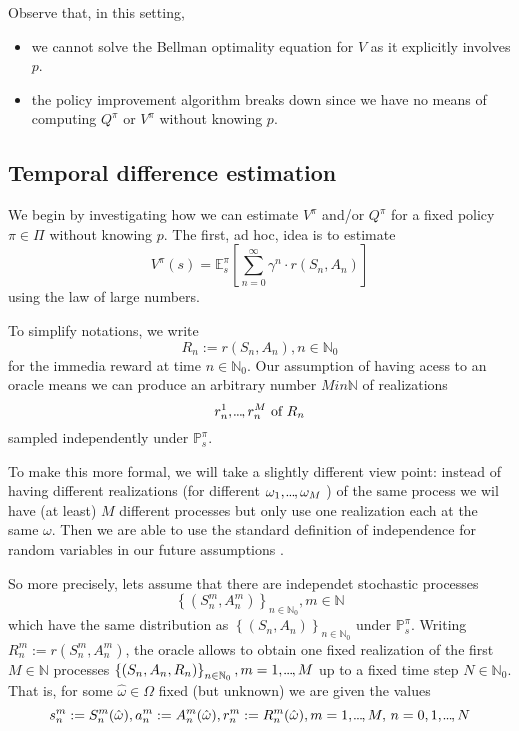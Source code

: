 Observe that, in this setting,
\begin{itemize}
    \item we cannot solve the Bellman optimality equation for \( V \) as it explicitly involves \( p \).
    \item the policy improvement algorithm breaks down since we have no means of computing \( Q^{\pi} \) or \( V^{\pi} \) without knowing \( p \).     
\end{itemize}

\subsection{Temporal difference estimation}

We begin by investigating how we can estimate \( V^{\pi} \) and/or \( Q^\pi \) for a fixed policy \( \pi \in \Pi \) without knowing \( p \). The first, ad hoc, idea is to estimate 
\[
    V^{\pi}(s) = \mathbb{E}_s^\pi \left[ \sum_{n=0}^{\infty} \gamma^n \cdot r(S_n, A_n) \right]
\] 
using the law of large numbers.


To simplify notations, we write 
\[
    R_n := r(S_n, A_n), n \in \mathbb{N}_{0}
\] 
for the immedia reward at time \( n \in \mathbb{N}_{0} \).
Our assumption of having acess to an oracle means we can produce an arbitrary number \( M in \mathbb{N} \) of realizations 
\[
    r_n^1, \kern-0.10em.\kern-0.06em.\kern-0.06em.\kern-0.1em, r_n^M \text{ of } R_n
\]
sampled independently under \( \mathbb{P}_s^\pi \).

To make this more formal, we will take a slightly different view point: instead of having different realizations (for different \( \omega_1, \kern-0.10em.\kern-0.06em.\kern-0.06em.\kern-0.1em, \omega_M \) ) of the same process we wil have (at least) \( M \) different processes but only use one realization each at the same \( \omega \). Then we are able to use the standard definition of independence for random variables in our future assumptions .

So more precisely, lets assume that there are independet stochastic processes 
\[
    \left\{ \left( S_n^m, A_n^m \right) \right\}_{n \in \mathbb{N}_{0}}, m \in \mathbb{N}
\]
which have the same distribution 
as \( \left\{ \left( S_n, A_n \right) \right\}_{n \in \mathbb{N}_{0}} \) under \( \mathbb{P}_s^{\pi} \). Writing \( R_n^m := r(S_n^m, A_n^m) \), the oracle allows to obtain one fixed realization of the first \( M \in \mathbb{N} \) processes \( \left\{ \left( S_n,A_n, R_n \right) \right\}_{n \in \mathbb{N}_{0}}, m = 1, \kern-0.10em.\kern-0.06em.\kern-0.06em.\kern-0.1em, M \) up to a fixed time step \( N \in \mathbb{N}_{0} \). That is, for some \( \hat{\omega} \in \Omega \) fixed (but unknown) we are given the values
\[
    s_n^m := S_n^m(\hat{\omega}), a_n^m := A_n^m(\hat{\omega}), r_n^m := R_n^m(\hat{\omega}), m = 1,\kern-0.10em.\kern-0.06em.\kern-0.06em.\kern-0.1em, M,\, n = 0,1,\kern-0.10em.\kern-0.06em.\kern-0.06em.\kern-0.1em,N
\]      


